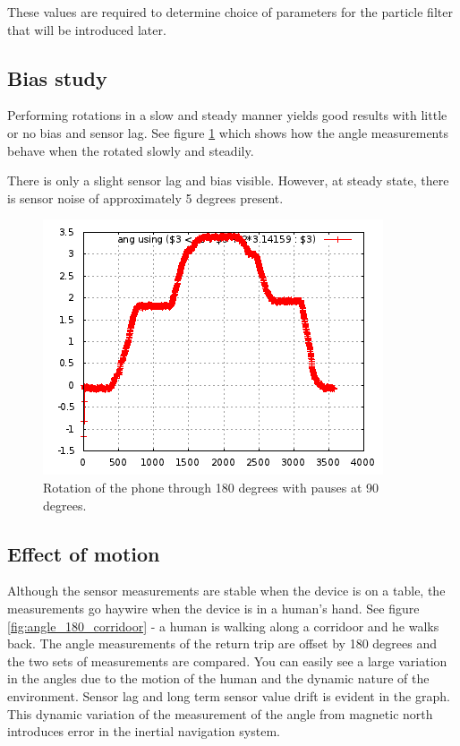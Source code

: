 
These values are required to determine choice of parameters for the particle
filter that will be introduced later.

\subsection{Bias study}

Performing rotations in a slow and steady manner yields good results with little
or no bias and sensor lag. See figure \ref{fig:angle_180_rotation_table} which 
shows how the angle measurements behave when the rotated slowly and steadily.

There is only a slight sensor lag and bias visible. However, at steady state,
there is sensor noise of approximately 5 degrees present.

\begin{figure}\centering
    \includegraphics{figures/angle_180_rotation_table.png}
    \caption{Rotation of the phone through 180 degrees with pauses at 90 degrees.\label{fig:angle_180_rotation_table}}
\end{figure}


\subsection{Effect of motion}

Although the sensor measurements are stable when the device is on a table,
the measurements go haywire when the device is in a human's hand. See figure
\ref{fig:angle_180_corridoor} - a human is walking along a corridoor and he walks
back. The angle measurements of the return trip are offset by 180 degrees and
the two sets of measurements are compared. You can easily see a large variation
in the angles due to the motion of the human and the dynamic nature of the environment.
Sensor lag and long term sensor value drift is evident in the graph.
This dynamic variation of the measurement of the angle from magnetic north 
introduces error in the inertial navigation system.

